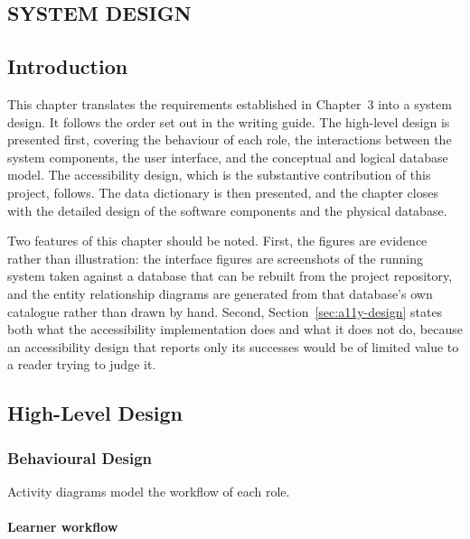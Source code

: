 \documentclass[12pt, oneside]{article} %
\begin{document}

\newpage
\vfill \null
\thispagestyle{empty}
\begin{center}
\section{SYSTEM DESIGN}
\end{center}
\vspace{2cm}

\subsection{Introduction}

This chapter translates the requirements established in Chapter~3 into a system design. It follows the order set out in the writing guide. The high-level design is presented first, covering the behaviour of each role, the interactions between the system components, the user interface, and the conceptual and logical database model. The accessibility design, which is the substantive contribution of this project, follows. The data dictionary is then presented, and the chapter closes with the detailed design of the software components and the physical database.

Two features of this chapter should be noted. First, the figures are evidence rather than illustration: the interface figures are screenshots of the running system taken against a database that can be rebuilt from the project repository, and the entity relationship diagrams are generated from that database's own catalogue rather than drawn by hand. Second, Section~\ref{sec:a11y-design} states both what the accessibility implementation does and what it does not do, because an accessibility design that reports only its successes would be of limited value to a reader trying to judge it.

\subsection{High-Level Design}

\subsubsection{Behavioural Design}

Activity diagrams model the workflow of each role.

\paragraph{Learner workflow}
\end{document}
